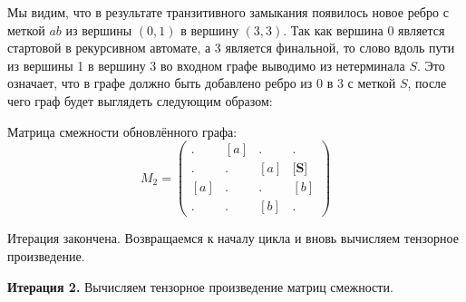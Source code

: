 \begin{example}
Мы видим, что в результате транзитивного замыкания появилось новое ребро с меткой $ab$ из вершины $(0,1)$ в вершину $(3,3)$.
Так как вершина 0 является стартовой в рекурсивном автомате, а 3 является финальной, то слово вдоль пути из вершины 1 в вершину 3 во входном графе выводимо из нетерминала $S$.
Это означает, что в графе должно быть добавлено ребро из $0$ в $3$ с меткой $S$, после чего граф будет выглядеть следующим образом:

\begin{center}
  
\end{center}

Матрица смежности обновлённого графа:
\[ M_2 =
\begin{pmatrix}
. & [a] & . & . \\
. & . & [a] & \textbf{[S]} \\
[a] & . & . & [b] \\
. & . & [b] & .
\end{pmatrix}
\]

Итерация закончена.
Возвращаемся к началу цикла и вновь вычисляем тензорное произведение.

\textbf{Итерация 2.}
Вычисляем тензорное произведение матриц смежности.


\end{example}
